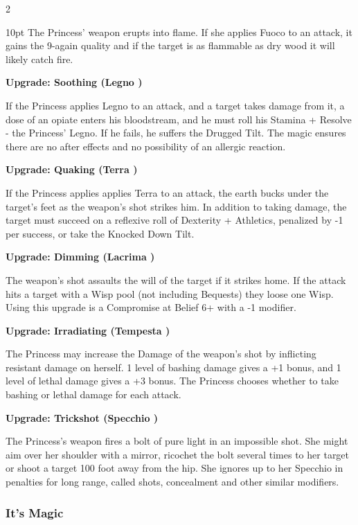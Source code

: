\begin{multicols}{2}
\begin{myindentpar}{10pt}
The Princess' weapon erupts into flame. If she applies Fuoco to an attack, it gains the 9-again quality and if the target is as flammable as dry wood it will likely catch fire. 

\textbf{Upgrade: Soothing (Legno \textbullet\textbullet)}

If the Princess applies Legno to an attack, and a target takes damage from it, a dose of an opiate enters his bloodstream, and he must roll his Stamina + Resolve - the Princess' Legno. If he fails, he suffers the Drugged Tilt. The magic ensures there are no after effects and no possibility of an allergic reaction. 

\textbf{Upgrade: Quaking (Terra \textbullet\textbullet)} 

If the Princess applies applies Terra to an attack, the earth bucks under the target's feet as the weapon's shot strikes him. In addition to taking damage, the target must succeed on a reflexive roll of Dexterity + Athletics, penalized by -1 per success, or take the Knocked Down Tilt.

\textbf{Upgrade: Dimming (Lacrima \textbullet\textbullet)}

The weapon's shot assaults the will of the target if it strikes home. If the attack hits a target with a Wisp pool (not including Bequests) they loose one Wisp. Using this upgrade is a Compromise at Belief 6+ with a -1 modifier.

\textbf{Upgrade: Irradiating (Tempesta \textbullet\textbullet)}

The Princess may increase the Damage of the weapon's shot by inflicting resistant damage on herself. 1 level of bashing damage gives a +1 bonus, and 1 level of lethal damage gives a +3 bonus. The Princess chooses whether to take bashing or lethal damage for each attack.

\textbf{Upgrade: Trickshot (Specchio \textbullet\textbullet)}

The Princess's weapon fires a bolt of pure light in an impossible shot. She might aim over her shoulder with a mirror, ricochet the bolt several times to her target or shoot a target 100 foot away from the hip. She ignores up to her Specchio in penalties for long range, called shots, concealment and other similar modifiers.\end{myindentpar}

\begin{mybox}
 
 \subsubsection*{It's Magic} 
 

\end{mybox}
\end{multicols}
